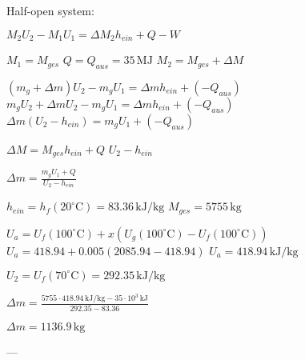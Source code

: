 Half-open system:  

\( M_2 U_2 - M_1 U_1 = \Delta M_2 h_{ein} + Q - W \)  

\( M_1 = M_{ges} \)  
\( Q = Q_{aus} = 35 \, \text{MJ} \)  
\( M_2 = M_{ges} + \Delta M \)  

\( (m_g + \Delta m) U_2 - m_g U_1 = \Delta m h_{ein} + (-Q_{aus}) \)  
\( m_g U_2 + \Delta m U_2 - m_g U_1 = \Delta m h_{ein} + (-Q_{aus}) \)  
\( \Delta m (U_2 - h_{ein}) = m_g U_1 + (-Q_{aus}) \)  

\( \Delta M = M_{ges} h_{ein} + Q \)  
\( U_2 - h_{ein} \)  

\( \Delta m = \frac{m_g U_1 + Q}{U_2 - h_{ein}} \)  

\( h_{ein} = h_{f}(20^\circ \text{C}) = 83.36 \, \text{kJ/kg} \)  
\( M_{ges} = 5755 \, \text{kg} \)  

\( U_a = U_f(100^\circ \text{C}) + x (U_g(100^\circ \text{C}) - U_f(100^\circ \text{C})) \)  
\( U_a = 418.94 + 0.005 (2085.94 - 418.94) \)  
\( U_a = 418.94 \, \text{kJ/kg} \)  

\( U_2 = U_f(70^\circ \text{C}) = 292.35 \, \text{kJ/kg} \)  

\( \Delta m = \frac{5755 \cdot 418.94 \, \text{kJ/kg} - 35 \cdot 10^3 \, \text{kJ}}{292.35 - 83.36} \)  

\( \Delta m = 1136.9 \, \text{kg} \)  

---